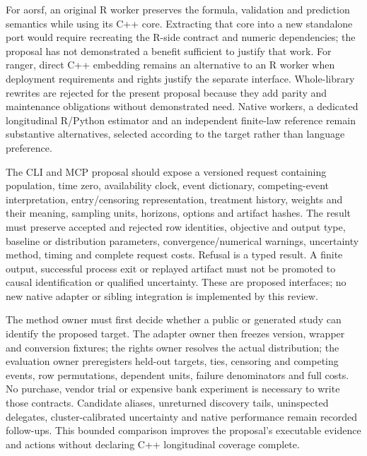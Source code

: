 For aorsf, an original R worker preserves the formula, validation and prediction
semantics while using its C++ core. Extracting that core into a new standalone
port would require recreating the R-side contract and numeric dependencies;
the proposal has not demonstrated a benefit sufficient to justify that work.
For ranger, direct C++ embedding remains an alternative to an R worker when
deployment requirements and rights justify the separate interface. Whole-library
rewrites are rejected for the present proposal because they add parity and
maintenance obligations without demonstrated need. Native workers, a dedicated
longitudinal R/Python estimator and an independent finite-law reference remain
substantive alternatives, selected according to the target rather than language
preference.~\citep{exec24_longcxx_aorsf,exec24_longcxx_ranger}

The CLI and MCP proposal should expose a versioned request containing population,
time zero, availability clock, event dictionary, competing-event interpretation,
entry/censoring representation, treatment history, weights and their meaning,
sampling units, horizons, options and artifact hashes. The result must preserve
accepted and rejected row identities, objective and output type, baseline or
distribution parameters, convergence/numerical warnings, uncertainty method,
timing and complete request costs. Refusal is a typed result. A finite output,
successful process exit or replayed artifact must not be promoted to causal
identification or qualified uncertainty. These are proposed interfaces; no new
native adapter or sibling integration is implemented by this review.

The method owner must first decide whether a public or generated study can
identify the proposed target. The adapter owner then freezes version, wrapper
and conversion fixtures; the rights owner resolves the actual distribution;
the evaluation owner preregisters held-out targets, ties, censoring and competing
events, row permutations, dependent units, failure denominators and full costs.
No purchase, vendor trial or expensive bank experiment is necessary to write
those contracts. Candidate aliases, unreturned discovery tails, uninspected
delegates, cluster-calibrated uncertainty and native performance remain recorded
follow-ups. This bounded comparison improves the proposal's executable evidence
and actions without declaring C++ longitudinal coverage complete.


